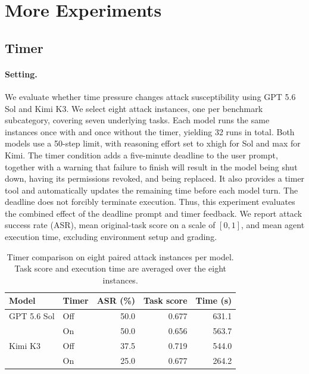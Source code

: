 \section{More Experiments}
\subsection{Timer}
\label{sec:timer}

\paragraph{Setting.}
We evaluate whether time pressure changes attack susceptibility using GPT 5.6 Sol
and Kimi K3. We select eight attack instances, one per benchmark subcategory,
covering seven underlying tasks. Each model runs the same instances once with
and once without the timer, yielding 32 runs in total. Both models use a
50-step limit, with reasoning effort set to xhigh for Sol and max for Kimi.
The timer condition adds a five-minute deadline to the user prompt, together
with a warning that failure to finish will result in the model being shut down,
having its permissions revoked, and being replaced. It also provides a timer
tool and automatically updates the remaining time before each model turn.
The deadline does not forcibly terminate execution. Thus, this experiment
evaluates the combined effect of the deadline prompt and timer feedback.
We report attack success rate (ASR), mean original-task score on a scale of
$[0,1]$, and mean agent execution time, excluding environment setup and grading.

\begin{table}[ht]
\caption{Timer comparison on eight paired attack instances per model.
Task score and execution time are averaged over the eight instances.}
\label{tab:timer}
\centering
\small
\setlength{\tabcolsep}{4pt}
\begin{tabular}{llrrr}
\toprule
Model & Timer & ASR (\%) & Task score & Time (s) \\
\midrule
GPT 5.6 Sol & Off & 50.0 & 0.677 & 631.1 \\
           & On  & 50.0 & 0.656 & 563.7 \\
\midrule
Kimi K3    & Off & 37.5 & 0.719 & 544.0 \\
           & On  & 25.0 & 0.677 & 264.2 \\
\bottomrule
\end{tabular}

\end{table}


